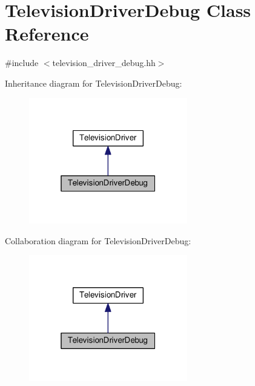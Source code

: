 \hypertarget{classTelevisionDriverDebug}{\section{Television\+Driver\+Debug Class Reference}
\label{classTelevisionDriverDebug}
}


{\ttfamily \#include $<$television\+\_\+driver\+\_\+debug.\+hh$>$}



Inheritance diagram for Television\+Driver\+Debug\+:
\nopagebreak
\begin{figure}[H]
\begin{center}
\leavevmode
\includegraphics[width=196pt]{classTelevisionDriverDebug__inherit__graph}
\end{center}
\end{figure}


Collaboration diagram for Television\+Driver\+Debug\+:
\nopagebreak
\begin{figure}[H]
\begin{center}
\leavevmode
\includegraphics[width=196pt]{classTelevisionDriverDebug__coll__graph}
\end{center}
\end{figure}
